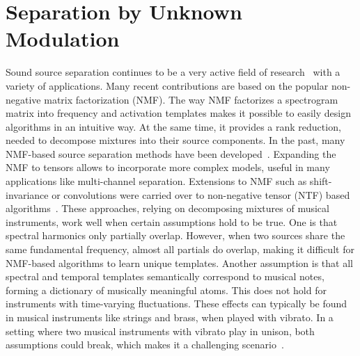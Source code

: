 \chapter{Separation by Unknown Modulation}


Sound source separation continues to be a very active field of research~\cite{vincent14} with a variety of applications. Many recent contributions are based on the popular non-negative matrix factorization (NMF). The way NMF factorizes a spectrogram matrix into frequency and activation templates makes it possible to easily design algorithms in an intuitive way. At the same time, it provides a rank reduction, needed to decompose mixtures into their source components.
In the past, many NMF-based source separation methods have been developed~\cite{smaragdis03, smaragdis04, virtanen07}. Expanding the NMF to tensors allows to incorporate more complex models, useful in many applications like multi-channel separation. Extensions to NMF such as shift-invariance or convolutions were carried over to non-negative tensor (NTF) based algorithms~\cite{fitzgerald05, fitzgerald08, fitzgerald06, fevotte10, ozerov11}. These approaches, relying on decomposing mixtures of musical instruments, work well when certain assumptions hold to be true.
One is that spectral harmonics only partially overlap. However, when two sources share the same fundamental frequency, almost all partials do overlap, making it difficult for NMF-based algorithms to learn unique templates. Another assumption is that all spectral and temporal templates semantically correspond to musical notes, forming a dictionary of musically meaningful atoms.
This does not hold for instruments with time-varying fluctuations. These effects can typically be found in musical instruments like strings and brass, when played with vibrato. In a setting where two musical instruments with vibrato play in unison, both assumptions could break, which makes it a challenging scenario~\cite{stoeter14}.

